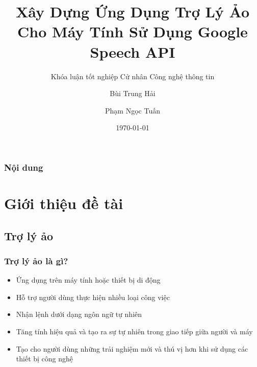 \documentclass{beamer}
\title[Khóa luận tốt nghiệp]{\textbf{Xây Dựng Ứng Dụng Trợ Lý Ảo Cho Máy Tính Sử Dụng Google Speech API}} %
\subtitle{Khóa luận tốt nghiệp Cử nhân Công nghệ thông tin}
\author{Bùi Trung Hải \and Phạm Ngọc Tuấn} %
\institute[] %
{
GVHD: TS. Ngô Minh Nhựt \\
\medskip
Trường Đại học Khoa học tự nhiên TP. Hồ Chí Minh \\
Khoa Công nghệ thông tin \\
Hệ Cử nhân tài năng
}
\date{\today} %
\begin{document}
\begin{frame}
\titlepage %
\end{frame}

\begin{frame}
\frametitle{Nội dung} %
\tableofcontents %
\end{frame}


\section{Giới thiệu đề tài}

\subsection{Trợ lý ảo}

\begin{frame}
\frametitle{Trợ lý ảo là gì?}
\begin{itemize}
\item Ứng dụng trên máy tính hoặc thiết bị di động
\item Hỗ trợ người dùng thực hiện nhiều loại công việc
\item Nhận lệnh dưới dạng ngôn ngữ tự nhiên
\item Tăng tính hiệu quả và tạo ra sự tự nhiên trong giao tiếp giữa người và máy
\item Tạo cho người dùng những trải nghiệm mới và thú vị hơn khi sử dụng các thiết bị công nghệ
\end{itemize}
\end{frame}
\end{document}
